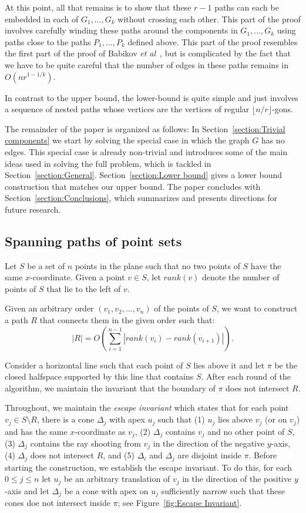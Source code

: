 \documentclass[a4paper, 11pt]{article}
\newcommand{\etal}{\emph{et al}}
\begin{document}
At this point, all that remains is to show that these $r-1$ paths
can each be embedded in each of $G_1,\ldots,G_k$ without crossing
each other.  This part of the proof involves carefully winding
these paths around the components in $G_1,\ldots,G_k$ using paths
close to the paths $P_1,\ldots,P_k$ defined above. This part of
the proof resembles the first part of the proof of Babikov \etal\
\cite{babikov.souvaine.ea:constructing}, but is complicated by the fact
that we have to be quite careful that the number of edges in these paths
remains in $O(nr^{1-1/k})$.

In contrast to the upper bound, the lower-bound is quite simple and just involves a sequence of nested paths whose vertices are the vertices of regular $\lfloor n/r\rfloor$-gons. 

The remainder of the paper is organized as follows: In Section~\ref{section:Trivial components} we start by solving the special case in which the graph $G$ has no edges. This special case is already non-trivial and introduces some of the main ideas used in solving the full problem, which is tackled in Section~\ref{section:General}. Section~\ref{section:Lower bound} gives a lower bound construction that matches our upper bound.  The paper concludes with Section~\ref{section:Conclusions}, which summarizes and presents directions for future research.  


\subsection{Spanning paths of point sets}
Let $S$ be a set of $n$ points in the plane such that no two points of $S$ have the same $x$-coordinate. 
Given a point $v\in S$, let $rank(v)$ denote the number of points of $S$ that lie to the left of $v$.

Given an arbitrary order $(v_1, v_2, \ldots, v_n)$ of the points of $S$, we want to construct a path $R$ that connects them in the given order such that:  $$|R|  = O\left(\sum_{i=1}^{n-1} |rank(v_i) - rank(v_{i+1})| \right).$$

Consider a horizontal line such that each point of $S$ lies above it and let $\pi$ be the closed halfspace supported by this line that contains $S$. After each round of the algorithm, we maintain the invariant that the boundary of $\pi$ does not intersect $R$.

Throughout, we maintain the \emph{escape invariant} which states that for each point $v_j\in S \setminus R$, there is a cone $\Delta_j$ with apex $u_j$ such that (1) $u_j$ lies above $v_j$ (or on $v_j$) and has the same $x$-coordinate as $v_j$, (2) $\Delta_j$ contains $v_j$ and no other point of $S$, (3) $\Delta_j$ contains the ray shooting from $v_j$ in the direction of the negative $y$-axis, (4) $\Delta_j$ does not intersect $R$, and (5) $\Delta_i$ and $\Delta_j$ are disjoint inside $\pi$.
Before starting the construction, we establish the escape invariant. To do this, for each $0\leq j\leq n$ let $u_j$ be an arbitrary translation of $v_j$ in the direction of the positive $y$-axis and let $\Delta_j$ be a cone with apex on $u_j$ sufficiently narrow such that these cones doe not intersect inside $\pi$; see Figure~\ref{fig:Escape Invariant}.
\end{document}
